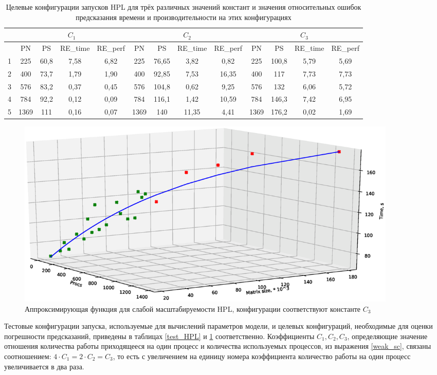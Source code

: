 	\begin{table}
		\begin{tabular}{|r||c|c|c|c||c|c|c|c||c|c|c|c|}
			\hline
			& \multicolumn{4}{|c|}{\(C_1\)} & \multicolumn{4}{|c|}{\(C_2\)} & \multicolumn{4}{|c|}{\(C_3\)} \\ \hline
			\textnumero & PN & PS & RE\_time & RE\_perf & PN & PS & RE\_time & RE\_perf & PN & PS & RE\_time & RE\_perf \\ \hline
			1 & 225 & 60,8 & 7,58 &	6,82 & 225 & 76,65 & 3,82 & 0,82 & 225 & 100,8 & 5,79 & 5,69 \\ \hline
			2 & 400 & 73,7 & 1,79 & 1,90 & 400 & 92,85 & 7,53 & 16,35 & 400 & 117 & 7,73 & 7,73 \\ \hline
			3 & 576 & 83,2 & 0,37 & 0,45 & 576 & 104,8 & 0,62 & 9,25 & 576 & 132 & 6,06 & 5,72 \\ \hline
			4 & 784 & 92,2 & 0,12 & 0,09 & 784 & 116,1 & 1,42 & 10,59 & 784 & 146,3 & 7,42 & 6,95 \\ \hline
			5 & 1369 & 111 & 0,16 & 0,07 & 1369 & 140 & 11,35 & 4,41 & 1369 & 176,2 & 0,02 & 1,69 \\ \hline
		\end{tabular}
		\caption{Целевые конфигурации запусков HPL для трёх различных значений констант и значения относительных ошибок предсказания времени и производительности на этих конфигурациях}
		\label{target_HPL}
	\end{table}

	\begin{figure}[t]
		\centering
		\includegraphics[width=0.9\textwidth]{hpl_k3}
		\caption{Аппроксимирующая функция для слабой масштабируемости HPL, конфигурации соответствуют константе \(C_3\)}
		\label{figure_HPL_C_3}
	\end{figure}

	Тестовые конфигурации запуска, используемые для вычислений параметров модели, и целевых конфигураций, необходимые для оценки погрешности предсказаний, приведены в таблицах \ref{test_HPL} и \ref{target_HPL} соответственно. Коэффициенты \(C_1, C_2, C_3\), определяющие значение отношения количества работы приходящееся на один процесс и количества используемых процессов, из выражения \ref{weak_sc}, связаны соотношением: \(4 \cdot C_1 = 2 \cdot C_2 = C_3 \), то есть с увеличением на единицу номера коэффициента количество работы на один процесс увеличивается в два раза.

